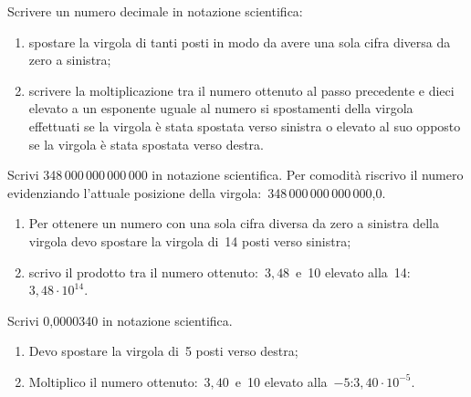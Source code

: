 \begin{procedura}{}{}
Scrivere un numero decimale in notazione scientifica:
\begin{enumerate}[noitemsep, label=(\alph*)] %
\item spostare la virgola di tanti posti in modo da avere una sola cifra
diversa da zero a sinistra;
\item scrivere la moltiplicazione tra il numero ottenuto al passo 
precedente e dieci elevato a un esponente uguale al numero si spostamenti 
della virgola effettuati se la virgola è stata spostata verso sinistra o 
elevato al suo opposto se la virgola è stata spostata verso destra.
\end{enumerate}
\end{procedura}

\begin{esempio}{}{}
Scrivi 348\,000\,000\,000\,000 in notazione scientifica.
Per comodità riscrivo il numero evidenziando l'attuale 
posizione della virgola:~348\,000\,000\,000\,000,0.
\begin{enumerate}[noitemsep, label=(\alph*)]
\item Per ottenere un numero con una sola cifra diversa 
da zero a sinistra della virgola devo spostare la virgola di~14 posti 
verso sinistra;
\item scrivo il prodotto tra il numero 
ottenuto:~\(3,48\)~e~10 elevato alla~14: \quad 
\(3,48 \cdot 10^{14}\).
\end{enumerate}

\end{esempio}
\begin{esempio}{}{}
Scrivi 0,0000340 in notazione scientifica.
\begin{enumerate}[noitemsep, label=(\alph*)]
\item Devo spostare la virgola di~5 posti verso destra;
\item Moltiplico il numero ottenuto:~\(3,40\)~e~10 elevato 
alla~\(-5\):\quad\(3,40 \cdot 10^{-5}\).
\end{enumerate}
\end{esempio}


